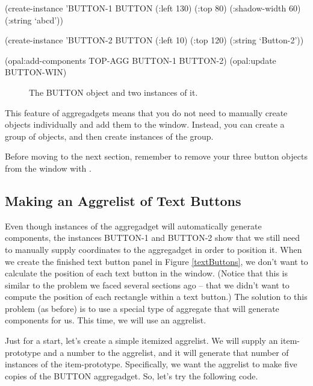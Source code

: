 \begin{programexample}
(create-instance 'BUTTON-1 BUTTON
   (:left 130) (:top 80)
   (:shadow-width 60)
   (:string `abcd'))

(create-instance 'BUTTON-2 BUTTON
   (:left 10) (:top 120)
   (:string `Button-2'))

(opal:add-components TOP-AGG BUTTON-1 BUTTON-2)
(opal:update BUTTON-WIN)
\end{programexample}

\begin{figure}
\begin{center}
\end{center}
\caption{The BUTTON object and two instances of it.}
\end{figure}

This feature of aggregadgets means that you do not need to manually
create objects individually and add them to the window.  Instead, you
can create a group of objects, and then create instances of the group.

Before moving to the next section, remember to remove your three button
objects from the window with .


\subsection{Making an Aggrelist of Text Buttons}

Even though instances of the aggregadget will automatically generate
components, the instances BUTTON-1 and BUTTON-2 show that we still
need to manually supply coordinates to the aggregadget in order to
position it.  When we create the finished text button panel in Figure
\ref{textButtons}, we don't want to calculate the position of each
text button in the window.  (Notice that this is similar to the
problem we faced several sections ago -- that we didn't want to
compute the position of each rectangle within a text button.)  The
solution to this problem (as before) is to use a special type of
aggregate that will generate components for us.  This time, we will
use an aggrelist.

Just for a start, let's create a simple itemized aggrelist.  We will
supply an item-prototype and a number to the aggrelist, and it will
generate that number of instances of the item-prototype.
Specifically, we want the aggrelist to make five copies of the BUTTON
aggregadget.  So, let's try the following code.

